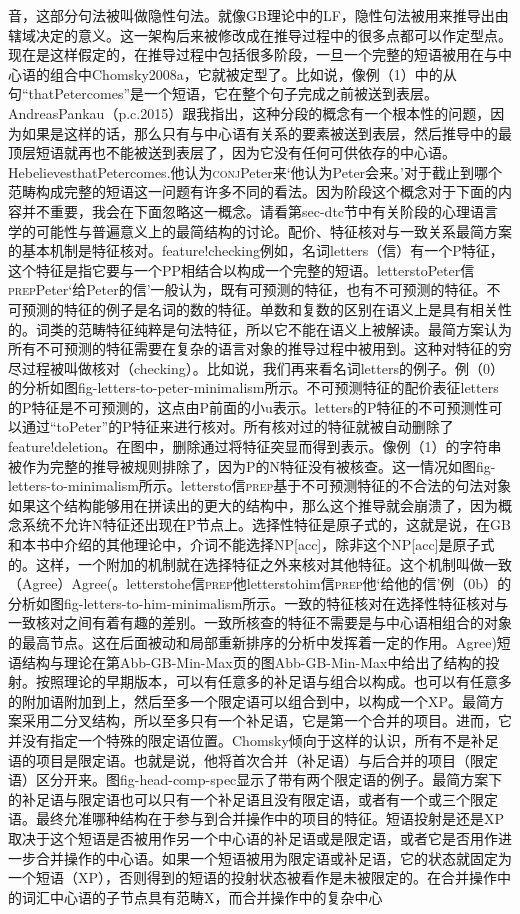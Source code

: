 音，这部分句法被叫做隐性句法。就像GB理论中的LF，隐性句法被用来推导出由辖域决定的意义。这一架构后来被修改成在推导过程中的很多点都可以作定型点。现在是这样假定的，在推导过程中包括很多阶段，一旦一个完整的短语被用在与中心语的组合中Chomsky2008a，它就被定型了。比如说，像例（1）中的从句“thatPetercomes”是一个短语，它在整个句子完成之前被送到表层。AndreasPankau（p.c.2015）跟我指出，这种分段的概念有一个根本性的问题，因为如果是这样的话，那么只有与中心语有关系的要素被送到表层，然后推导中的最顶层短语就再也不能被送到表层了，因为它没有任何可供依存的中心语。HebelievesthatPetercomes.他认为\textsc{conj}Peter来`他认为Peter会来。'对于截止到哪个范畴构成完整的短语这一问题有许多不同的看法。因为阶段这个概念对于下面的内容并不重要，我会在下面忽略这一概念。请看第sec-dtc节中有关阶段的心理语言学的可能性与普遍意义上的最简结构的讨论。配价、特征核对与一致关系最简方案的基本机制是特征核对。feature!checking例如，名词letters（信）有一个P特征，这个特征是指它要与一个PP相结合以构成一个完整的短语。letterstoPeter信\textsc{prep}Peter`给Peter的信'一般认为，既有可预测的特征，也有不可预测的特征。不可预测的特征的例子是名词的数的特征。单数和复数的区别在语义上是具有相关性的。词类的范畴特征纯粹是句法特征，所以它不能在语义上被解读。最简方案认为所有不可预测的特征需要在复杂的语言对象的推导过程中被用到。这种对特征的穷尽过程被叫做核对（checking）。比如说，我们再来看名词letters的例子。例（0）的分析如图fig-letters-to-peter-minimalism所示。不可预测特征的配价表征letters的P特征是不可预测的，这点由P前面的小u表示。letters的P特征的不可预测性可以通过“toPeter”的P特征来进行核对。所有核对过的特征就被自动删除了feature!deletion。在图中，删除通过将特征突显而得到表示。像例（1）的字符串被作为完整的推导被规则排除了，因为P的N特征没有被核查。这一情况如图fig-letters-to-minimalism所示。lettersto信\textsc{prep}基于不可预测特征的不合法的句法对象如果这个结构能够用在拼读出的更大的结构中，那么这个推导就会崩溃了，因为概念系统不允许N特征还出现在P节点上。选择性特征是原子式的，这就是说，在GB和本书中介绍的其他理论中，介词不能选择NP[acc]，除非这个NP[acc]是原子式的。这样，一个附加的机制就在选择特征之外来核对其他特征。这个机制叫做一致（Agree）Agree(。letterstohe信\textsc{prep}他letterstohim信\textsc{prep}他`给他的信'例（0b）的分析如图fig-letters-to-him-minimalism所示。一致的特征核对在选择性特征核对与一致核对之间有着有趣的差别。一致所核查的特征不需要是与中心语相组合的对象的最高节点。这在后面被动和局部重新排序的分析中发挥着一定的作用。Agree)短语结构与理论在第Abb-GB-Min-Max页的图Abb-GB-Min-Max中给出了结构的投射。按照理论的早期版本，可以有任意多的补足语与组合以构成。也可以有任意多的附加语附加到上，然后至多一个限定语可以组合到中，以构成一个XP。最简方案采用二分叉结构，所以至多只有一个补足语，它是第一个合并的项目。进而，它并没有指定一个特殊的限定语位置。Chomsky倾向于这样的认识，所有不是补足语的项目是限定语。也就是说，他将首次合并（补足语）与后合并的项目（限定语）区分开来。图fig-head-comp-spec显示了带有两个限定语的例子。最简方案下的补足语与限定语也可以只有一个补足语且没有限定语，或者有一个或三个限定语。最终允准哪种结构在于参与到合并操作中的项目的特征。短语投射是还是XP取决于这个短语是否被用作另一个中心语的补足语或是限定语，或者它是否用作进一步合并操作的中心语。如果一个短语被用为限定语或补足语，它的状态就固定为一个短语（XP），否则得到的短语的投射状态被看作是未被限定的。在合并操作中的词汇中心语的子节点具有范畴X，而合并操作中的复杂中心